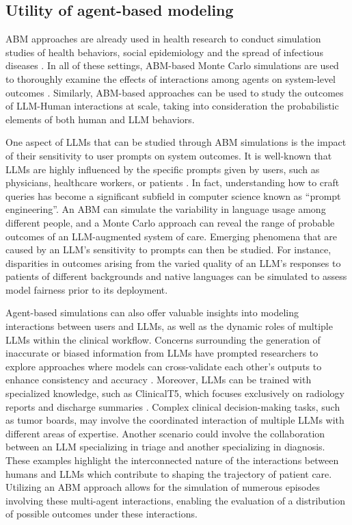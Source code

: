\documentclass[10pt]{article}
\begin{document}
\begin{multicols}{2}
\section{Utility of agent-based modeling}
ABM approaches are already used in health research to conduct simulation studies of health behaviors, social epidemiology and the spread of infectious diseases \cite{tracy2018agent}. In all of these settings, ABM-based Monte Carlo simulations are used to thoroughly examine the effects of interactions among agents on system-level outcomes \cite{bonabeau2002agent}. Similarly, ABM-based approaches can be used to study the outcomes of LLM-Human interactions at scale, taking into consideration the probabilistic elements of both human and LLM behaviors.  

One aspect of LLMs that can be studied through ABM simulations is the impact of their sensitivity to user prompts on system outcomes. It is well-known that LLMs are highly influenced by the specific prompts given by users, such as physicians, healthcare workers, or patients \cite{lu2022fantastically}. In fact, understanding how to craft queries has become a significant subfield in computer science known as “prompt engineering”. An ABM can simulate the variability in language usage among different people, and a Monte Carlo approach can reveal the range of probable outcomes of an LLM-augmented system of care. Emerging phenomena that are caused by an LLM’s sensitivity to prompts can then be studied. For instance, disparities in outcomes arising from the varied quality of an LLM’s responses to patients of different backgrounds and native languages can be simulated to assess model fairness prior to its deployment.  

Agent-based simulations can also offer valuable insights into modeling interactions between users and LLMs, as well as the dynamic roles of multiple LLMs within the clinical workflow. Concerns surrounding the generation of inaccurate or biased information from LLMs have prompted researchers to explore approaches where models can cross-validate each other’s outputs to enhance consistency and accuracy \cite{dash2023evaluation,wang2022self}. Moreover, LLMs can be trained with specialized knowledge, such as ClinicalT5, which focuses exclusively on radiology reports and discharge summaries \cite{lehman2023clinical}. Complex clinical decision-making tasks, such as tumor boards, may involve the coordinated interaction of multiple LLMs with different areas of expertise. Another scenario could involve the collaboration between an LLM specializing in triage and another specializing in diagnosis. These examples highlight the interconnected nature of the interactions between humans and LLMs which contribute to shaping the trajectory of patient care. Utilizing an ABM approach allows for the simulation of numerous episodes involving these multi-agent interactions, enabling the evaluation of a distribution of possible outcomes under these interactions.


\end{multicols}
\end{document}
